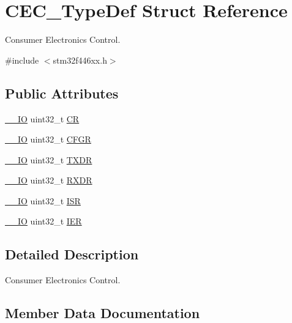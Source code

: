 \hypertarget{struct_c_e_c___type_def}{}\section{C\+E\+C\+\_\+\+Type\+Def Struct Reference}
\label{struct_c_e_c___type_def}


Consumer Electronics Control.  




{\ttfamily \#include $<$stm32f446xx.\+h$>$}

\subsection*{Public Attributes}
\begin{DoxyCompactItemize}
\item 
\hyperlink{core__sc300_8h_aec43007d9998a0a0e01faede4133d6be}{\+\_\+\+\_\+\+IO} uint32\+\_\+t \hyperlink{struct_c_e_c___type_def_ab272f34d3acb1edeaaeaf087b284d77f}{CR}
\item 
\hyperlink{core__sc300_8h_aec43007d9998a0a0e01faede4133d6be}{\+\_\+\+\_\+\+IO} uint32\+\_\+t \hyperlink{struct_c_e_c___type_def_a91a55cd277c20e5c5ad228fd9013d014}{C\+F\+GR}
\item 
\hyperlink{core__sc300_8h_aec43007d9998a0a0e01faede4133d6be}{\+\_\+\+\_\+\+IO} uint32\+\_\+t \hyperlink{struct_c_e_c___type_def_ab8d8a4703a2a87dcd4d1d7b1f38bd464}{T\+X\+DR}
\item 
\hyperlink{core__sc300_8h_aec43007d9998a0a0e01faede4133d6be}{\+\_\+\+\_\+\+IO} uint32\+\_\+t \hyperlink{struct_c_e_c___type_def_ae2bc7566d4fe07776fc8e5b2ace32981}{R\+X\+DR}
\item 
\hyperlink{core__sc300_8h_aec43007d9998a0a0e01faede4133d6be}{\+\_\+\+\_\+\+IO} uint32\+\_\+t \hyperlink{struct_c_e_c___type_def_ae4e736a0aa1304172139d21b9d75c08a}{I\+SR}
\item 
\hyperlink{core__sc300_8h_aec43007d9998a0a0e01faede4133d6be}{\+\_\+\+\_\+\+IO} uint32\+\_\+t \hyperlink{struct_c_e_c___type_def_acbba4df34183910fdc40fb2c4918e303}{I\+ER}
\end{DoxyCompactItemize}


\subsection{Detailed Description}
Consumer Electronics Control. 

\subsection{Member Data Documentation}
